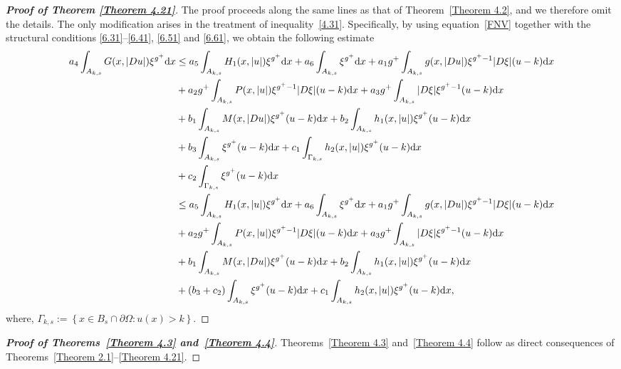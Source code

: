 \documentclass[10pt,reqno]{amsart}
\newcommand *\w{^\wedge}
\theoremstyle{definition}
\numberwithin{equation}{section}
\begin{document}
\begin{proof}[\textbf{Proof of Theorem \ref{Theorem 4.21}}]
The proof proceeds along the same lines as that of Theorem~\ref{Theorem 4.2}, and we therefore omit the details. The only modification arises in the treatment of inequality~\eqref{4.31}. Specifically, by using equation~\eqref{FNV} together with the structural conditions \eqref{6.31}--\eqref{6.41}, \eqref{6.51} and \eqref{6.61}, we obtain the following estimate
\begin{align}\label{4.43}
\begin{split}
a_4 \int_{A_{k,s}} G(x,|Du|) \xi^{g^+} {\rm d}x &\leq a_5 \int_{A_{k,s}} H_1(x,|u|) \xi^{g^+} {\rm d}x +a_6 \int_{A_{k,s}} \xi^{g^+} {\rm d}x+ a_1 g^+ \int_{A_{k,s}} g(x,|Du|) \xi^{g^+-1} |D\xi|(u - k) {\rm d}x\\
&+a_2 g^+\int_{A_{k,s}} P(x,|u|) \xi^{g^+-1} |D\xi|(u - k) {\rm d}x+ a_3g^+ \int_{A_{k,s}} |D\xi| \xi^{g^+-1}(u - k) {\rm d}x\\
&+ b_1 \int_{A_{k,s}}M(x,|Du|) \xi^{g^+} (u - k) {\rm d}x+ b_2 \int_{A_{k,s}}h_1(x,|u|) \xi^{g^+} (u - k) {\rm d}x\\
&+ b_3 \int_{A_{k,s}} \xi^{g^+} (u - k) {\rm d}x+ c_1 \int_{\Gamma_{k,s}}h_2(x,|u|) \xi^{g^+} (u - k) {\rm d}x\\
&+ c_2 \int_{\Gamma_{k,s}} \xi^{g^+} (u - k) {\rm d}x\\
&\leq a_5 \int_{A_{k,s}} H_1(x,|u|) \xi^{g^+} {\rm d}x +a_6 \int_{A_{k,s}} \xi^{g^+} {\rm d}x+ a_1 g^+ \int_{A_{k,s}} g(x,|Du|) \xi^{g^+-1} |D\xi|(u - k) {\rm d}x\\
&+a_2 g^+\int_{A_{k,s}} P(x,|u|) \xi^{g^+-1} |D\xi|(u - k) {\rm d}x+ a_3g^+ \int_{A_{k,s}} |D\xi| \xi^{g^+-1}(u - k) {\rm d}x\\
&+ b_1 \int_{A_{k,s}}M(x,|Du|) \xi^{g^+} (u - k) {\rm d}x+ b_2 \int_{A_{k,s}}h_1(x,|u|) \xi^{g^+} (u - k) {\rm d}x\\
&+ (b_3 +c_2)\int_{A_{k,s}} \xi^{g^+} (u - k) {\rm d}x+ c_1 \int_{A_{k,s}}h_2(x,|u|) \xi^{g^+} (u - k) {\rm d}x,
\end{split}
\end{align}
where,
\(
\Gamma_{k,s} := \left\{ x \in B_s \cap \partial\Omega : u(x) > k \right\}.
\)
\end{proof}
\begin{proof}[\textbf{Proof of Theorems~\ref{Theorem 4.3} and~\ref{Theorem 4.4}}]
Theorems~\ref{Theorem 4.3} and~\ref{Theorem 4.4} follow as direct consequences of Theorems~\ref{Theorem 2.1}--\ref{Theorem 4.21}.
\end{proof}
\end{document}
